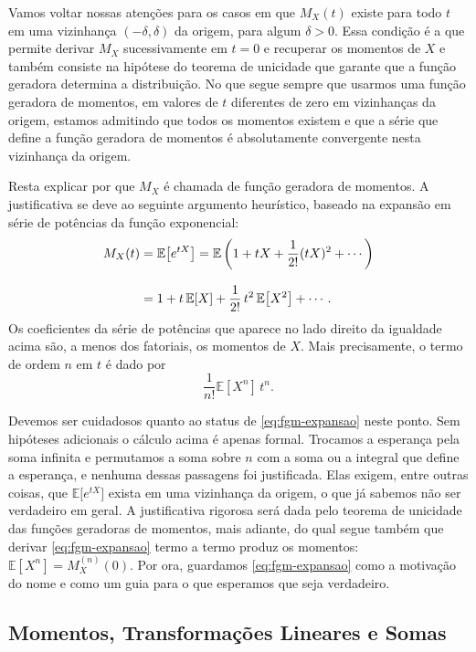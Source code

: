 \documentclass[12pt,portuguese]{article}
\theoremstyle{definition}
\theoremstyle{plainexercise}
\theoremstyle{starredexercise}
\theoremstyle{definition}
\begin{document}
Vamos voltar nossas atenções para os casos em que $M_X(t)$ existe para todo $t$ em uma vizinhança
$(-\delta,\delta)$ da origem, para algum $\delta>0$. Essa condição é a que
permite derivar $M_X$ sucessivamente em $t=0$ e recuperar os momentos de $X$ e 
também consiste na hipótese do teorema de unicidade que garante que a função geradora
determina a distribuição. No que segue sempre que usarmos uma função geradora de momentos, em
valores de $t$ diferentes de zero em vizinhanças da origem, estamos admitindo que todos
os momentos existem e que a série que define a função geradora de momentos é absolutamente
convergente nesta vizinhança da origem.

\medskip

Resta explicar por que $M_X$ é chamada de função geradora de momentos.
A justificativa se deve ao seguinte argumento heurístico,
baseado na expansão em série de potências da função exponencial:
\begin{align}
M_X(t)
&= \mathbb{E}\bigl[e^{tX}\bigr] = \mathbb{E}\left(1 + tX + \frac{1}{2!}(tX)^2 + \cdots\right)
\notag \\[0.3cm]
&= 1 + t\,\mathbb{E}[X] + \frac{1}{2!}\,t^2\,\mathbb{E}\bigl[X^2\bigr] + \cdots.
\label{eq:fgm-expansao}
\end{align}
Os coeficientes da série de potências que aparece no lado direito da
igualdade acima são, a menos dos fatoriais, os momentos de $X$. Mais precisamente, o termo de
ordem $n$ em $t$ é dado por 
\[
\frac{1}{n!}\mathbb{E}[X^n]\,t^n.
\]


Devemos ser cuidadosos quanto ao status de \eqref{eq:fgm-expansao} neste ponto.
Sem hipóteses adicionais o cálculo acima é apenas formal. Trocamos a esperança pela soma infinita e
permutamos a soma sobre $n$ com a soma ou a integral que define a esperança, e
nenhuma dessas passagens foi justificada. Elas exigem, entre outras coisas, que
$\mathbb{E}\bigl[e^{tX}\bigr]$ exista em uma vizinhança da origem, o que já
sabemos não ser verdadeiro em geral. A justificativa rigorosa será dada pelo
teorema de unicidade das funções geradoras de momentos, mais adiante, do qual
segue também que derivar \eqref{eq:fgm-expansao} termo a termo produz os
momentos: $\mathbb{E}[X^n] = M_X^{(n)}(0)$. Por ora, guardamos
\eqref{eq:fgm-expansao} como a motivação do nome e como um guia para o que
esperamos que seja verdadeiro.

\subsection{Momentos, Transformações Lineares e Somas}\label{subsec:fgm-momentos}
\end{document}
